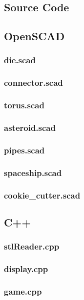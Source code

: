 \documentclass[12pt]{article}
\begin{document}
\begin{onehalfspace}
\section{Source Code}
\subsection{OpenSCAD}
\subsubsection{die.scad}
\subsubsection{connector.scad}
\subsubsection{torus.scad}
\subsubsection{asteroid.scad}
\subsubsection{pipes.scad}
\subsubsection{spaceship.scad}
\subsubsection{cookie\_cutter.scad}

\subsection{C++}
\subsubsection{stlReader.cpp}
% 
\subsubsection{display.cpp}
% 
\subsubsection{game.cpp}
% 


\end{onehalfspace}
\end{document}
